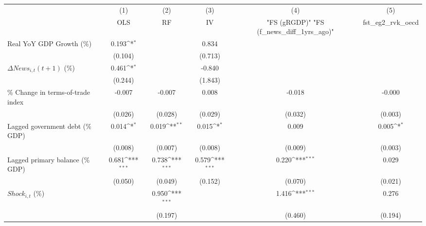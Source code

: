 {
\def\sym#1{\ifmmode^{#1}\else\(^{#1}\)\fi}
\begin{tabular}{l*{5}{c}}
\toprule
                    &\multicolumn{1}{c}{(1)}&\multicolumn{1}{c}{(2)}&\multicolumn{1}{c}{(3)}&\multicolumn{1}{c}{(4)}&\multicolumn{1}{c}{(5)}\\
                    &\multicolumn{1}{c}{OLS}&\multicolumn{1}{c}{RF}&\multicolumn{1}{c}{IV}&\multicolumn{1}{c}{ "FS (gRGDP)"  "FS (f_news_diff_1yrs_ago)" }&\multicolumn{1}{c}{fst_eg2_rvk_oecd}\\
\midrule
Real YoY GDP Growth (\%)&       0.193\sym{*}  &                     &       0.834         &                     &                     \\
                    &     (0.104)         &                     &     (0.713)         &                     &                     \\
\addlinespace
$ \Delta News_{i,t}(t+1)$ (\%)&       0.461\sym{*}  &                     &      -0.840         &                     &                     \\
                    &     (0.244)         &                     &     (1.843)         &                     &                     \\
\addlinespace
\% Change in terms-of-trade index&      -0.007         &      -0.007         &       0.008         &      -0.018         &      -0.000         \\
                    &     (0.026)         &     (0.028)         &     (0.029)         &     (0.032)         &     (0.003)         \\
\addlinespace
Lagged government debt (\% GDP)&       0.014\sym{*}  &       0.019\sym{**} &       0.015\sym{*}  &       0.009         &       0.005\sym{*}  \\
                    &     (0.008)         &     (0.007)         &     (0.008)         &     (0.009)         &     (0.003)         \\
\addlinespace
Lagged primary balance (\% GDP)&       0.681\sym{***}&       0.738\sym{***}&       0.579\sym{***}&       0.220\sym{***}&       0.029         \\
                    &     (0.050)         &     (0.049)         &     (0.152)         &     (0.070)         &     (0.021)         \\
\addlinespace
$ Shock_{i,t}$ (\%) &                     &       0.950\sym{***}&                     &       1.416\sym{***}&       0.276         \\
                    &                     &     (0.197)         &                     &     (0.460)         &     (0.194)         \\

\end{tabular}}
